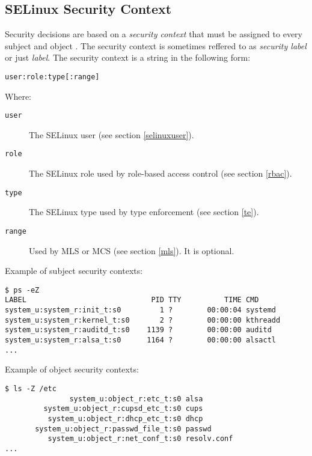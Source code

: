 \subsection{SELinux Security Context}
\label{context}
Security decisions are based on a \emph{security context} that must be assigned
to every subject and object \cite[pp.~27--28]{tsn}. The security context is
sometimes reffered to as \emph{security label} or just \emph{label}.  The
security context is a string in the following form:
\begin{lstlisting}
user:role:type[:range]
\end{lstlisting}
Where:
\begin{description}
    \item [\texttt{user}] The SELinux user (see section \ref{selinuxuser}).
    \item [\texttt{role}] The SELinux role used by role-based access control
        (see section \ref{rbac}).
    \item [\texttt{type}] The SELinux type used by type enforcement (see section
        \ref{te}).
    \item [\texttt{range}] Used by MLS or MCS (see section \ref{mls}). It is optional.
\end{description}

Example of subject security contexts:
\begin{lstlisting}
$ ps -eZ
LABEL                             PID TTY          TIME CMD
system_u:system_r:init_t:s0         1 ?        00:00:04 systemd
system_u:system_r:kernel_t:s0       2 ?        00:00:00 kthreadd
system_u:system_r:auditd_t:s0    1139 ?        00:00:00 auditd
system_u:system_r:alsa_t:s0      1164 ?        00:00:00 alsactl
...
\end{lstlisting}

Example of object security contexts:
\begin{lstlisting}
$ ls -Z /etc
               system_u:object_r:etc_t:s0 alsa
         system_u:object_r:cupsd_etc_t:s0 cups
          system_u:object_r:dhcp_etc_t:s0 dhcp
       system_u:object_r:passwd_file_t:s0 passwd
          system_u:object_r:net_conf_t:s0 resolv.conf
...
\end{lstlisting}


